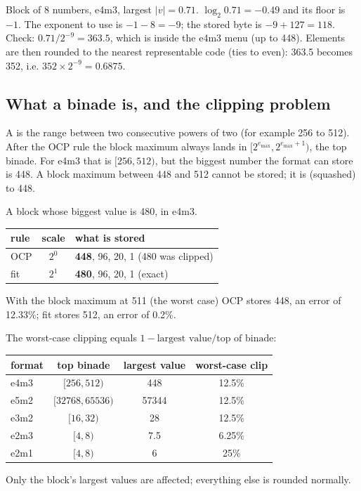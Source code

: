 \begin{worked}
Block of 8 numbers, e4m3, largest $|v|=0.71$. $\log_2 0.71=-0.49$ and its floor is $-1$. The exponent to use is
$-1-8=-9$; the stored byte is $-9+127=118$. Check: $0.71/2^{-9}=363.5$, which is inside the e4m3 menu (up to 448).
Elements are then rounded to the nearest representable code (ties to even): 363.5 becomes 352, i.e. $352\times2^{-9}=0.6875$.
\end{worked}

\subsection{What a binade is, and the clipping problem}
A  is the range between two consecutive powers of two (for example 256 to 512). After the OCP rule
the block maximum always lands in $[2^{e_{\max}},2^{e_{\max}+1})$, the top binade. For e4m3 that is $[256,512)$, but the
biggest number the format can store is 448. A block maximum between 448 and 512 cannot be stored; it is
 (squashed) to 448.

\begin{worked}
A block whose biggest value is 480, in e4m3.
\begin{center}\small
\begin{tabular}{lcl}
\toprule
rule & scale & what is stored \\
\midrule
OCP & $2^{0}$ & \textbf{448}, 96, 20, 1 \quad (480 was clipped) \\
fit & $2^{1}$ & \textbf{480}, 96, 20, 1 \quad (exact) \\
\bottomrule
\end{tabular}
\end{center}
With the block maximum at 511 (the worst case) OCP stores 448, an error of 12.33\%; fit stores 512, an error of 0.2\%.
\end{worked}

The worst-case clipping equals $1-\text{largest value}/\text{top of binade}$:
\begin{center}\small
\begin{tabular}{lccc}
\toprule
format & top binade & largest value & worst-case clip \\
\midrule
e4m3 & $[256,512)$ & 448 & 12.5\% \\
e5m2 & $[32768,65536)$ & 57344 & 12.5\% \\
e3m2 & $[16,32)$ & 28 & 12.5\% \\
e2m3 & $[4,8)$ & 7.5 & 6.25\% \\
e2m1 & $[4,8)$ & 6 & 25\% \\
\bottomrule
\end{tabular}
\end{center}
Only the block's largest values are affected; everything else is rounded normally.

